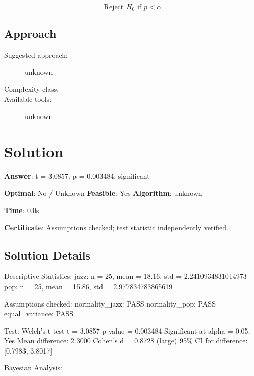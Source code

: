 \documentclass[11pt, a4paper]{article}
\begin{document}
\begin{equation}
\text{Reject } H_0 \text{ if } p < \alpha
\end{equation}

\subsection{Approach}

\begin{description}
  \item[Suggested approach:] unknown
  \item[Complexity class:] 
  \item[Available tools:] unknown
\end{description}
\section{Solution}

\begin{polyaresult}

\textbf{Answer}: t = 3.0857; p = 0.003484; significant


\textbf{Optimal}: No / Unknown \hfill
\textbf{Feasible}: Yes
\textbf{Algorithm}: unknown \quad $$

\textbf{Time}: 0.0s

\textbf{Certificate}: Assumptions checked; test statistic independently verified.

\end{polyaresult}

\subsection{Solution Details}

Descriptive Statistics:
  jazz: n = 25, mean = 18.16, std = 2.2410934831014973
  pop: n = 25, mean = 15.86, std = 2.977834783865619

Assumptions checked:
  normality\_jazz: PASS
  normality\_pop: PASS
  equal\_variance: PASS

Test: Welch's t-test
  t = 3.0857
  p-value = 0.003484
  Significant at alpha = 0.05: Yes
  Mean difference: 2.3000
  Cohen's d = 0.8728 (large)
  95\% CI for difference: [0.7983, 3.8017]

Bayesian Analysis:
\end{document}
